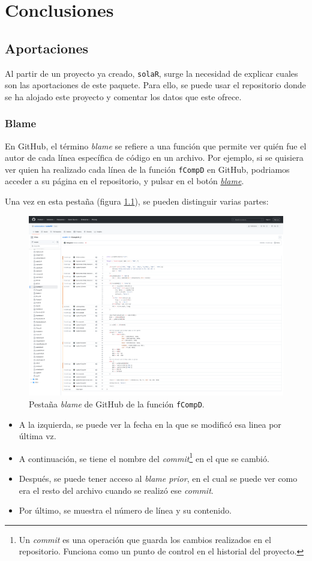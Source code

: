 \chapter{Conclusiones}
\section{Aportaciones}
\label{sec:org99acac7}
Al partir de un proyecto ya creado, \texttt{solaR}, surge la necesidad de explicar cuales son las aportaciones de este paquete. Para ello, se puede usar el repositorio donde se ha alojado este proyecto y comentar los datos que este ofrece.

\subsection{Blame}
\label{sec:orgdef87b3}
En GitHub, el término \emph{blame} se refiere a una función que permite ver quién fue el autor de cada línea específica de código en un archivo. Por ejemplo, si se quisiera ver quien ha realizado cada línea de la función \texttt{fCompD} en GitHub, podriamos acceder a su página en el repositorio, y pulsar en el botón \href{https://github.com/solarization/solaR2/blame/master/R/fCompD.R}{\emph{blame}}.

Una vez en esta pestaña (figura \ref{fig:blame}), se pueden distinguir varias partes:
\begin{figure}[htbp]
\centering
\includegraphics[width=.9\linewidth]{figuras/blame-fCompD.pdf}
\caption{Pestaña \emph{blame} de GitHub de la función \texttt{fCompD}. \label{fig:blame}}
\end{figure}
\begin{itemize}
\item A la izquierda, se puede ver la fecha en la que se modificó esa linea por última vz.
\item A continuación, se tiene el nombre del \emph{commit}\footnote{Un \emph{commit} es una operación que guarda los cambios realizados en el repositorio. Funciona como un punto de control en el historial del proyecto.} en el que se cambió.
\item Después, se puede tener acceso al \emph{blame prior}, en el cual se puede ver como era el resto del archivo cuando se realizó ese \emph{commit}.
\item Por último, se muestra el número de línea y su contenido.
\end{itemize}

